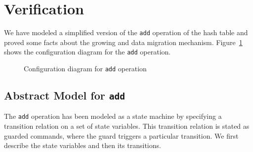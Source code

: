 \section{Verification}
\label{sec:veri}

We have modeled a simplified version of the \texttt{add} operation of
the hash table and proved some facts about the growing and data
migration mechanism. Figure~\ref{fig:model} shows the configuration
diagram for the \texttt{add} operation.

\newcommand{\pczero}{\mbox{init}}
\newcommand{\pcone}{\mbox{ready\hspace{-0.5mm}-to\hspace{-0.5mm}-add}}
\newcommand{\pctwo}{\mbox{added}}
\newcommand{\pcthree}{\mbox{error}}
\newcommand{\negate}[1]{\mbox{$\neg\ #1$}}
\newcommand{\incr}{\mbox{\xspace$+\hspace{-1mm}=$\xspace}}
\newcommand{\decr}{\mbox{\xspace$-\hspace{-1mm}=$\xspace}}
    
\begin{figure}[t]
\caption{Configuration diagram for \texttt{add} operation}
\label{fig:model}
\end{figure}

\subsection{Abstract Model for \texttt{add}}

The \texttt{add} operation has been modeled as a state machine by
specifying a transition relation on a set of state variables. This
transition relation is stated as guarded commands, where the guard
triggers a particular transition. We first describe the state
variables and then its transitions.

